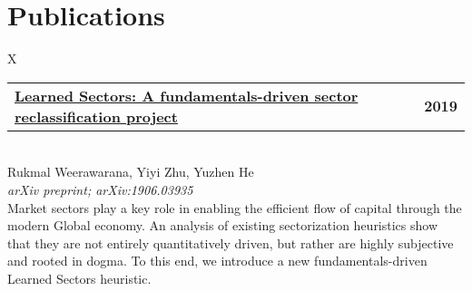 \documentclass[10pt]{article}
\newcommand{\tabularxwidth}{\textwidth}
\newcommand{\changeurlcolor}[1]{\hypersetup{urlcolor=#1}}
\begin{document}
    \vspace{-0.5em}


    
        \section{Publications}
        \vspace{-.5em}

    
        \begin{minipage}{\tabularxwidth}
        \begin{tabularx}{\tabularxwidth}{X}
            {
                \begin{tabularx}{\tabularxwidth}{@{}X r}
                    \textbf{\changeurlcolor{black}\href{https://arxiv.org/abs/1906.03935}{Learned Sectors: A fundamentals-driven sector reclassification project}} &
                    \textbf{
        2019} \\
                \end{tabularx}
            } \\
            Rukmal Weerawarana, Yiyi Zhu, Yuzhen He \\

            
                \textit{arXiv preprint; arXiv:1906.03935} \\
            
            

            
    Market sectors play a key role in enabling the efficient flow of capital through the modern Global economy. An analysis of existing sectorization heuristics show that they are not entirely quantitatively driven, but rather are highly subjective and rooted in dogma. To this end, we introduce a new fundamentals-driven Learned Sectors heuristic.
        \end{tabularx}

        
            \vspace{.3em}
        

        \end{minipage}
    
\end{document}

